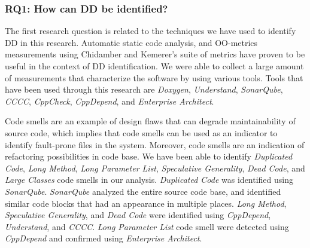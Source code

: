






\subsubsection{RQ1: How can DD be identified?} 
The first research question is related to the techniques we have used to identify DD in this research. Automatic static code analysis, and OO-metrics measurements using Chidamber and Kemerer's suite of metrics have proven to be useful in the context of DD identification. We were able to collect a large amount of measurements that characterize the software by using various tools. Tools that have been used through this research are \textit{Doxygen}, \textit{Understand}, \textit{SonarQube}, \textit{CCCC}, \textit{CppCheck}, \textit{CppDepend}, and \textit{Enterprise Architect}.

Code smells are an example of design flaws that can degrade maintainability of source code, which implies that code smells can be used as an indicator to identify fault-prone files in the system. Moreover, code smells are an indication of refactoring possibilities in code base. We have been able to identify \textit{Duplicated Code}, \textit{Long Method}, \textit{Long Parameter List}, \textit{Speculative Generality}, \textit{Dead Code}, and \textit{Large Classes} code smells in our analysis. \textit{Duplicated Code} was identified using \textit{SonarQube}. \textit{SonarQube} analyzed the entire source code base, and identified similar code blocks that had an appearance in multiple places. \textit{Long Method}, \textit{Speculative Generality}, and \textit{Dead Code} were identified using \textit{CppDepend}, \textit{Understand}, and \textit{CCCC}. \textit{Long Parameter List} code smell were detected using \textit{CppDepend} and confirmed using \textit{Enterprise Architect}.

